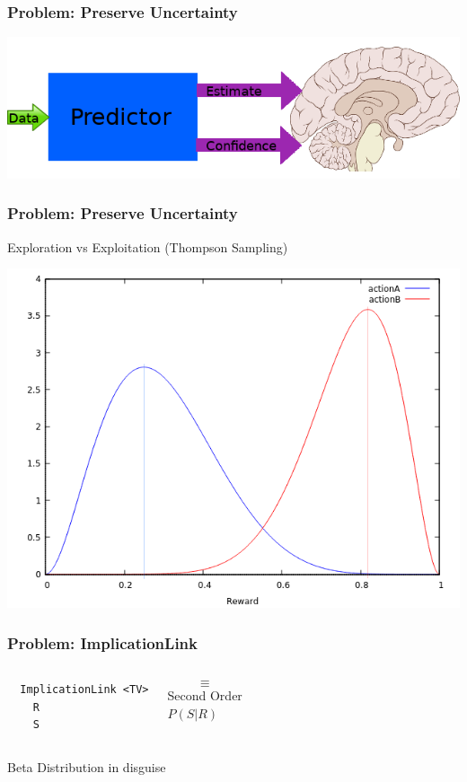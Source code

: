 \documentclass{beamer}
\begin{document}
\begin{frame}[fragile]
  \frametitle{Problem: Preserve Uncertainty}

  \includegraphics[scale=0.5]{images/preserve_uncertainty.png}
\end{frame}

\begin{frame}[fragile]
  \frametitle{Problem: Preserve Uncertainty}

  Exploration vs Exploitation (Thompson Sampling)

  \begin{center}
    \includegraphics[scale=0.55]{images/ActionA_ActionB_lines_alpha.png}
  \end{center}
\end{frame}

\begin{frame}[fragile]
  \frametitle{Problem: ImplicationLink}

\begin{columns}
\column{1.5in}

{\small
\begin{verbatim}
  ImplicationLink <TV>
    R
    S
\end{verbatim}
}

\column{1in}
$$\equiv$$
\column{1.5in}
Second Order\\
$P(S|R)$
\end{columns}

\begin{center}\alert{Beta Distribution} in disguise\end{center}

\end{frame}
\end{document}
